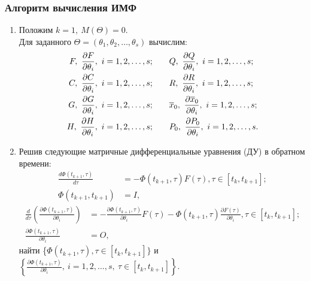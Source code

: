 \documentclass[a4paper,14pt]{extarticle}
\newcommand{\pd}[2]{\frac{\partial #1}{\partial #2}}
\begin{document}
\subsubsection{Алгоритм вычисления ИМФ}
\begin{enumerate}
	\item Положим $k = 1,\ M(\Theta) = 0$. \\
		Для заданного $\Theta = (\theta_1, \theta_2, \ldots, \theta_s)$ вычислим:
\begin{align*}
	F,\ \pd{F}{\theta_i},\ i=1,2,\ldots,s; \qquad &
	Q,\ \pd{Q}{\theta_i},\ i=1,2,\ldots,s; \\
	C,\ \pd{C}{\theta_i},\ i=1,2,\ldots,s; \qquad &
	R,\ \pd{R}{\theta_i},\ i=1,2,\ldots,s; \\
	G,\ \pd{G}{\theta_i},\ i=1,2,\ldots,s; \qquad &
	\ol{x}_0,\ \pd{\ol{x}_0}{\theta_i},\ i=1,2,\ldots,s; \\
	H,\ \pd{H}{\theta_i},\ i=1,2,\ldots,s; \qquad &
	P_0,\ \pd{P_0}{\theta_i},\ i=1,2,\ldots,s.
\end{align*}

\newpage

\newcommand{\deriv}[2]{\frac{d #1}{d #2}}

\item Решив следующие матричные дифференциальные уравнения (ДУ) в обратном
	времени:
	\begin{align*}
		\deriv{\Phi(t_{k+1}, \tau)}{\tau} &= - \Phi(t_{k+1}, \tau) F(\tau), \tau \in
			[t_k, t_{k+1}]; \\
		\Phi(t_{k+1}, t_{k+1}) &= I, 
	\end{align*}
	\begin{align*}
		\deriv{}{\tau} \left( \pd{\Phi(t_{k+1}, \tau)}{\theta_i} \right) &=
			- \pd{\Phi(t_{k+1}, \tau)}{\theta_i} F(\tau) - \Phi(t_{k+1}, \tau)
			\pd{F(\tau)}{\theta_i}, \tau \in [t_k, t_{k+1}]; \\
		\pd{\Phi(t_{k+1}, \tau)}{\theta_i} &= O,
	\end{align*}
	найти \{$\Phi(t_{k+1}, \tau), \tau \in [t_k, t_{k+1}]\}$ и 
		$\left\{ \pd{\Phi(t_{k+1}, \tau)}{\theta_i},\ i=1,2,\ldots,s,\ \tau \in
		[t_k, t_{k+1}] \right\}$.


\end{enumerate}
\end{document}
